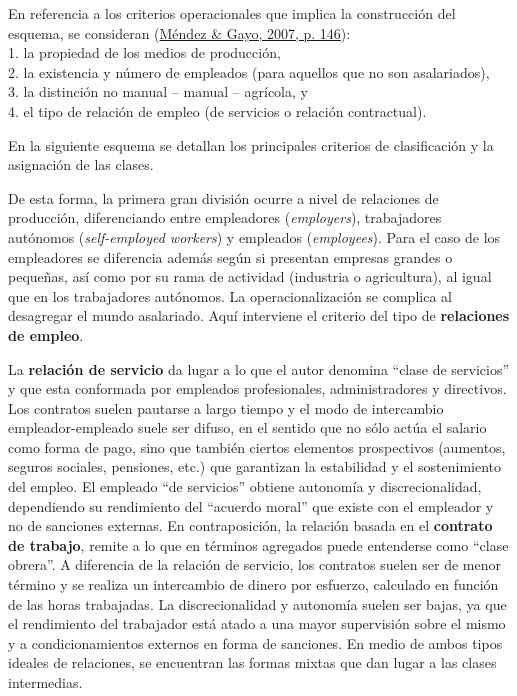 \documentclass[
]{article}
\begin{document}
En referencia a los criterios operacionales que implica la construcción del esquema, se consideran (\protect\hyperlink{ref-Mendez.Gayo2007}{Méndez \& Gayo, 2007, p. 146}):\\
1. la propiedad de los medios de producción,\\
2. la existencia y número de empleados (para aquellos que no son asalariados),\\
3. la distinción no manual -- manual -- agrícola, y\\
4. el tipo de relación de empleo (de servicios o relación contractual).

En la siguiente esquema se detallan los principales criterios de clasificación y la asignación de las clases.

De esta forma, la primera gran división ocurre a nivel de relaciones de producción, diferenciando entre empleadores (\emph{employers}), trabajadores autónomos (\emph{self-employed workers}) y empleados (\emph{employees}). Para el caso de los empleadores se diferencia además según si presentan empresas grandes o pequeñas, así como por su rama de actividad (industria o agricultura), al igual que en los trabajadores autónomos. La operacionalización se complica al desagregar el mundo asalariado. Aquí interviene el criterio del tipo de \textbf{relaciones de empleo}.

La \textbf{relación de servicio} da lugar a lo que el autor denomina ``clase de servicios'' y que esta conformada por empleados profesionales, administradores y directivos. Los contratos suelen pautarse a largo tiempo y el modo de intercambio empleador-empleado suele ser difuso, en el sentido que no sólo actúa el salario como forma de pago, sino que también ciertos elementos prospectivos (aumentos, seguros sociales, pensiones, etc.) que garantizan la estabilidad y el sostenimiento del empleo. El empleado ``de servicios'' obtiene autonomía y discrecionalidad, dependiendo su rendimiento del ``acuerdo moral'' que existe con el empleador y no de sanciones externas. En contraposición, la relación basada en el \textbf{contrato de trabajo}, remite a lo que en términos agregados puede entenderse como ``clase obrera''. A diferencia de la relación de servicio, los contratos suelen ser de menor término y se realiza un intercambio de dinero por esfuerzo, calculado en función de las horas trabajadas. La discrecionalidad y autonomía suelen ser bajas, ya que el rendimiento del trabajador está atado a una mayor supervisión sobre el mismo y a condicionamientos externos en forma de sanciones. En medio de ambos tipos ideales de relaciones, se encuentran las formas mixtas que dan lugar a las clases intermedias.
\end{document}
